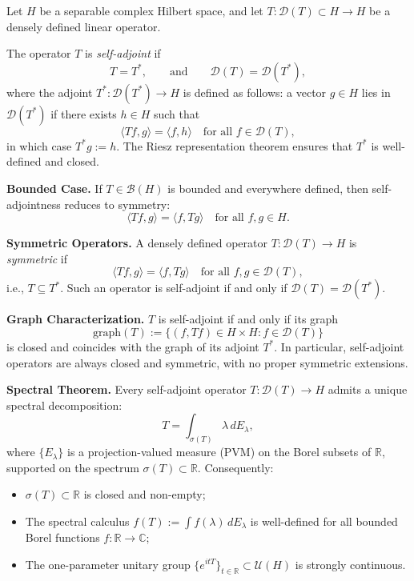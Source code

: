 \begin{definition}\label{def:selfadjoint_operator}
Let \( H \) be a separable complex Hilbert space, and let \( T \colon \mathcal{D}(T) \subset H \to H \) be a densely defined linear operator.

The operator \( T \) is \emph{self-adjoint} if
\[
T = T^*, \qquad \text{and} \qquad \mathcal{D}(T) = \mathcal{D}(T^*),
\]
where the adjoint \( T^* \colon \mathcal{D}(T^*) \to H \) is defined as follows: a vector \( g \in H \) lies in \( \mathcal{D}(T^*) \) if there exists \( h \in H \) such that
\[
\langle T f, g \rangle = \langle f, h \rangle \quad \text{for all } f \in \mathcal{D}(T),
\]
in which case \( T^* g := h \). The Riesz representation theorem ensures that \( T^* \) is well-defined and closed.

\medskip
\noindent\textbf{Bounded Case.}
If \( T \in \mathcal{B}(H) \) is bounded and everywhere defined, then self-adjointness reduces to symmetry:
\[
\langle T f, g \rangle = \langle f, T g \rangle \quad \text{for all } f, g \in H.
\]

\medskip
\noindent\textbf{Symmetric Operators.}
A densely defined operator \( T \colon \mathcal{D}(T) \to H \) is \emph{symmetric} if
\[
\langle T f, g \rangle = \langle f, T g \rangle \quad \text{for all } f, g \in \mathcal{D}(T),
\]
i.e., \( T \subseteq T^* \). Such an operator is self-adjoint if and only if \( \mathcal{D}(T) = \mathcal{D}(T^*) \).

\medskip
\noindent\textbf{Graph Characterization.}
\( T \) is self-adjoint if and only if its graph
\[
\mathrm{graph}(T) := \{ (f, Tf) \in H \times H : f \in \mathcal{D}(T) \}
\]
is closed and coincides with the graph of its adjoint \( T^* \). In particular, self-adjoint operators are always closed and symmetric, with no proper symmetric extensions.

\medskip
\noindent\textbf{Spectral Theorem.}
Every self-adjoint operator \( T \colon \mathcal{D}(T) \to H \) admits a unique spectral decomposition:
\[
T = \int_{\sigma(T)} \lambda \, dE_\lambda,
\]
where \( \{ E_\lambda \} \) is a projection-valued measure (PVM) on the Borel subsets of \( \mathbb{R} \), supported on the spectrum \( \sigma(T) \subset \mathbb{R} \). Consequently:
\begin{itemize}
    \item \( \sigma(T) \subset \mathbb{R} \) is closed and non-empty;
    \item The spectral calculus \( f(T) := \int f(\lambda)\, dE_\lambda \) is well-defined for all bounded Borel functions \( f \colon \mathbb{R} \to \mathbb{C} \);
    \item The one-parameter unitary group \( \{ e^{itT} \}_{t \in \mathbb{R}} \subset \mathcal{U}(H) \) is strongly continuous.
\end{itemize}


\end{definition}
